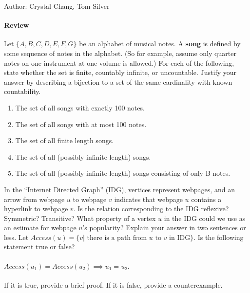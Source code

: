 \documentclass[solution, letterpaper]{cs20inclass}
\begin{document}

\noindent Author: Crystal Chang, Tom Silver%

\paragraph*{Review}

\problem
Let $\{A, B, C, D, E, F, G\}$ be an alphabet of musical notes. A \textbf{song} is defined by some sequence of notes in the alphabet. (So for example, assume only quarter notes on one instrument at one volume is allowed.) For each of the following, state whether the set is finite, countably infinite, or uncountable. Justify your answer by describing a bijection to a set of the same cardinality with known countability.

\begin{enumerate}

\item The set of all songs with exactly 100 notes.
\item The set of all songs with at most 100 notes.
\item The set of all finite length songs.
\item The set of all (possibly infinite length) songs.
\item The set of all (possibly infinite length) songs consisting of only B notes.

\end{enumerate}


\problem
In the ``Internet Directed Graph'' (IDG), vertices represent webpages, and an arrow from webpage $u$ to webpage $v$ indicates that webpage $u$ contains a hyperlink to webpage $v$. 
\subproblem Is the relation corresponding to the IDG reflexive? Symmetric? Transitive? 
\subproblem What property of a vertex $u$ in the IDG could we use as an estimate for webpage $u$'s popularity? Explain your answer in two sentences or less.
\subproblem Let $Access(u) = \{ v |  u  v \}$. Is the following statement true or false? 
\\
\\$Access(u_1) = Access(u_2) \implies u_1 = u_2$. 
\\
\\ If it is true, provide a brief proof. If it is false, provide a counterexample.
\end{document}
